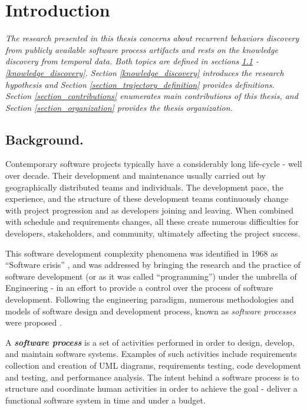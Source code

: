 \chapter{Introduction}

\textit{The research presented in this thesis concerns about recurrent behaviors discovery from
publicly available software process artifacts and rests on the knowledge discovery from
temporal data. Both topics are defined in sections \ref{section_background} - \ref{knowledge_discovery}.
Section \ref{knowledge_discovery} introduces the research hypothesis and 
Section \ref{section_trajectory_definition} provides definitions.
Section \ref{section_contributions} enumerates main contributions of this thesis,
and Section \ref{section_organization} provides the thesis organization.
}

\section{Background.}\label{section_background}
Contemporary software projects typically have a considerably long life-cycle - well over decade.
Their development and maintenance usually carried out by geographically distributed teams 
and individuals. The development pace, the experience, and the structure of these development 
teams continuously change with project progression and as developers joining and leaving. 
When combined with schedule and requirements changes, all these create numerous difficulties 
for developers, stakeholders, and community, ultimately affecting the project success. 

This software development complexity phenomena was identified in 1968 as ``Software crisis'' \cite{crisis}, 
and was addressed by bringing the research and the practice of software development 
(or as it was called ``programming'') under the umbrella of Engineering - in an effort to provide a 
control over the process of software development. 
Following the engineering paradigm, numerous methodologies and models of 
software design and development process, 
known as \textit{software processes} were proposed \cite{citeulike:10002165}.

A \textbf{\textit{software process}} is a set of activities performed in order to design, develop, and maintain 
software systems. Examples of such activities include requirements collection and creation of UML diagrams,
requirements testing, code development and testing, and performance analysis. 
The intent behind a software process is to structure and coordinate human activities in order to achieve 
the goal - deliver a functional software system in time and under a budget.

